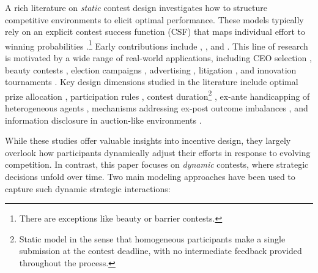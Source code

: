 \documentclass[mnsc]{informs3}
\begin{document}
A rich literature on \textit{static} contest design \citep{ales2017optimal_award} investigates how to structure competitive environments to elicit optimal performance. 
These models typically rely on an explicit contest success function (CSF) that maps individual effort to winning probabilities \citep{skaperdas1996contest}.\footnote{There are exceptions like beauty or barrier contests.} 
Early contributions include \citet{Tullock1980}, \citet{Lazear1981tournaments}, and \citet{nalebuff1983Competition}. 
This line of research is motivated by a wide range of real-world applications, including CEO selection \citep{tsoulouhas2006ceo}, beauty contests \citep{morris2002social}, election campaigns \citep{denter2020campaign}, advertising \citep{dockner2018Advertising}, litigation \citep{baik2007litigation, park2022litigation}, and innovation tournaments \citep{chen2021DataSharing}.
Key design dimensions studied in the literature include optimal prize allocation \citep{moldovanu2001optimal, ales2017optimal_award}, participation rules \citep{ales2021number_of_players, stouras2022role}, contest duration\footnote{Static model in the sense that homogeneous participants make a single submission at the contest deadline, with no intermediate feedback provided throughout the process.} \citep{korpeoglu2021duration}, ex-ante handicapping of heterogeneous agents \citep{tsoulouhas2006ceo, kirkegaard2012favoritism, syam2013sales}, mechanisms addressing ex-post outcome imbalances \citep{Imhof2016Ex_post}, and information disclosure in auction-like environments \citep{bergemann2022optimal, antsygina2023optimal}. 


While these studies offer valuable insights into incentive design, they largely overlook how participants dynamically adjust their efforts in response to evolving competition.
In contrast, this paper focuses on \textit{dynamic} contests, where strategic decisions unfold over time.
Two main modeling approaches have been used to capture such dynamic strategic interactions:
\end{document}
